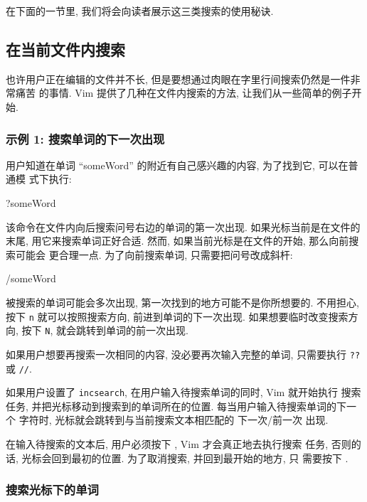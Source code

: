 在下面的一节里, 我们将会向读者展示这三类搜索的使用秘诀.

\subsection{在当前文件内搜索}
\label{subsec:search_the_current_file}

也许用户正在编辑的文件并不长, 但是要想通过肉眼在字里行间搜索仍然是一件非常痛苦
的事情. Vim 提供了几种在文件内搜索的方法, 让我们从一些简单的例子开始.

\subsubsection{示例 1: 搜索单词的下一次出现}
\label{subsubsec:example_1_find_the_next_occurrence_of_a_word}

用户知道在单词 ``someWord'' 的附近有自己感兴趣的内容, 为了找到它, 可以在普通模
式下执行:
\begin{vimcode}
?someWord
\end{vimcode}
该命令在文件内向后搜索问号右边的单词的第一次出现. 如果光标当前是在文件的末尾,
用它来搜索单词正好合适. 然而, 如果当前光标是在文件的开始, 那么向前搜索可能会
更合理一点. 为了向前搜索单词, 只需要把问号改成斜杆:
\begin{vimcode}
/someWord
\end{vimcode}
被搜索的单词可能会多次出现, 第一次找到的地方可能不是你所想要的. 不用担心, 按下
\texttt{n} 就可以按照搜索方向, 前进到单词的下一次出现. 如果想要临时改变搜索方向,
按下 \texttt{N}, 就会跳转到单词的前一次出现.

如果用户想要再搜索一次相同的内容, 没必要再次输入完整的单词, 只需要执行
\texttt{??} 或 \texttt{//}.

如果用户设置了 \texttt{incsearch}, 在用户输入待搜索单词的同时, Vim 就开始执行
搜索任务, 并把光标移动到搜索到的单词所在的位置. 每当用户输入待搜索单词的下一个
字符时, 光标就会跳转到与当前搜索文本相匹配的 下一次/前一次 出现.

\begin{warning}
    在输入待搜索的文本后, 用户必须按下 , Vim 才会真正地去执行搜索
    任务, 否则的话, 光标会回到最初的位置. 为了取消搜索, 并回到最开始的地方, 只
    需要按下 .
\end{warning}

\subsubsection{搜索光标下的单词}
\label{subsubsec:search_for_a_word_under_the_cursor}

